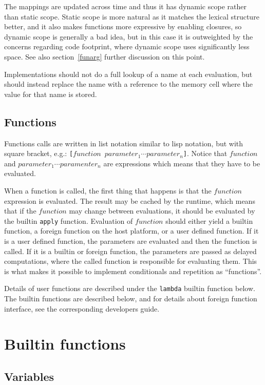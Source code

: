The mappings are updated across time and thus it has dynamic scope rather than static scope. Static scope is more natural as it matches the lexical structure better, and it also makes functions more expressive by enabling closures, so dynamic scope is generally a bad idea, but in this case it is outweighted by the concerns regarding code footprint, where dynamic scope uses significantly less space. 
See also section~\ref{funarg} further discussion on this point.

Implementations should not do a full lookup of a name at each evaluation, but should instead replace the name with a reference to the memory cell where the value for that name is stored.

\subsection{Functions}

Functions calls are written in list notation similar to lisp notation, but with square bracket, e.g.:
{\tt{[}$function$ $parameter_1\cdots parameter_n$\tt{]}}. 
Notice that $function$ and $parameter_1\cdots paramenter_n$ are expressions which means that they have to be evaluated.

When a function is called, the first thing that happens is that the $function$ expression is evaluated. The result may be cached by the runtime, which means that if the $function$ may change between evaluations, it should be evaluated by the builtin \verb|apply| function.
Evaluation of $function$ should either yield a builtin function, a foreign function on the host platform, or a user defined function. If it is a user defined function, the parameters are evaluated and then the function is called. If it is a builtin or foreign function, the parameters are passed as delayed computations, where the called function is responsible for evaluating them. 
This is what makes it possible to implement conditionals and repetition as ``functions''. 

Details of user functions are described under the \verb|lambda| builtin function below. The builtin functions are described below, and for details about foreign function interface, see the corresponding developers guide.


\section{Builtin functions}
\subsection{Variables}
